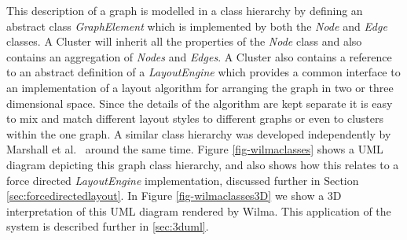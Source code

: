 \documentclass[runningheads]{cl2emult}
\begin{document}
This description of a graph is modelled in a class hierarchy by
defining an abstract class {\em GraphElement} which is implemented by
both the {\em Node} and {\em Edge} classes.  A {Cluster} will inherit
all the properties of the {\em Node} class and also contains an
aggregation of {\em Nodes} and {\em Edges}.  A {Cluster} also contains
a reference to an abstract definition of a {\em LayoutEngine} which
provides a common interface to an implementation of a layout algorithm
for arranging the graph in two or three dimensional space.  Since the
details of the algorithm are kept separate it is easy to mix and match
different layout styles to different graphs or even to clusters within
the one graph.  A similar class hierarchy was developed independently
by Marshall et al.~\cite{marshall00object} around the same time.
Figure \ref{fig-wilmaclasses} shows a UML diagram depicting this
graph class hierarchy, and also shows how this relates to a force
directed {\em LayoutEngine} implementation, discussed further in
Section \ref{sec:forcedirectedlayout}.  In Figure
\ref{fig-wilmaclasses3D} we show a 3D
interpretation of this UML diagram rendered by Wilma.  This application
of the system is described further in \ref{sec:3duml}.
\end{document}
